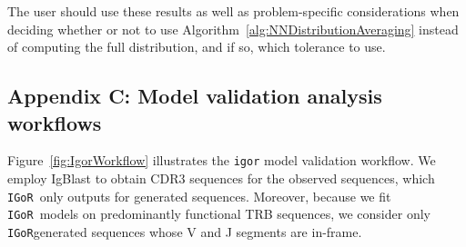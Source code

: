 \documentclass{article}
\newcommand{\igor}{\texttt{IGoR}}
\begin{document}
The user should use these results as well as problem-specific considerations when deciding whether or not to use Algorithm~\ref{alg:NNDistributionAveraging} instead of computing the full distribution, and if so, which tolerance to use.

\subsection*{Appendix C: Model validation analysis workflows}
Figure~\ref{fig:IgorWorkflow} illustrates the \texttt{igor} model validation workflow.
We employ IgBlast to obtain CDR3 sequences for the observed sequences, which \igor\ only outputs for generated sequences.
Moreover, because we fit \igor\ models on predominantly functional TRB sequences, we consider only \igor\-generated sequences whose V and J segments are in-frame.  
\end{document}
